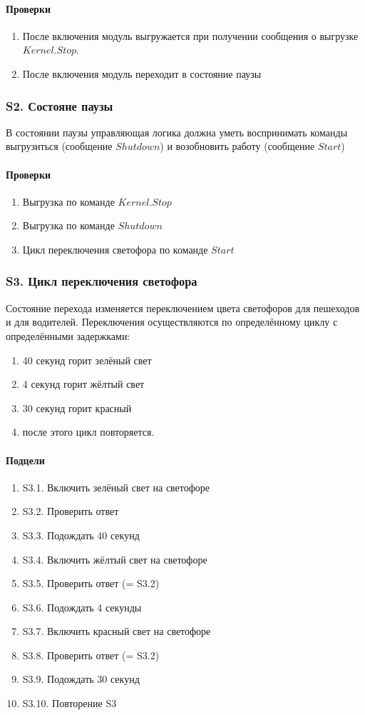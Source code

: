 			\paragraph{Проверки}
			\begin{enumerate}
				\item После включения модуль выгружается при получении сообщения о выгрузке $ Kernel.Stop $.
				\item После включения модуль переходит в состояние паузы
			\end{enumerate}
		\subsubsection{S2. Состояне паузы}
			В состоянии паузы управляющая логика должна уметь воспринимать команды выгрузиться (сообщение $ Shutdown $) и возобновить работу (сообщение $ Start $)
			\paragraph{Проверки}
				\begin{enumerate}
					\item Выгрузка по команде  $ Kernel.Stop $
					\item Выгрузка по команде $ Shutdown $
					\item Цикл переключения светофора по команде $ Start $
				\end{enumerate}
		\subsubsection{S3. Цикл переключения светофора}
		Состояние перехода изменяется переключением цвета светофоров для пешеходов и для водителей. Переключения осуществляются по определённому циклу с определёнными задержками:
			\begin{enumerate}
				\item 40 секунд горит зелёный свет
				\item 4 секунд горит жёлтый свет
				\item 30 секунд горит красный
				\item после этого цикл повторяется.
			\end{enumerate}
		\paragraph{Подцели}
			\begin{enumerate}
				\item S3.1. Включить зелёный свет на светофоре
				\item S3.2. Проверить ответ
				\item S3.3. Подождать 40 секунд
				\item S3.4. Включить жёлтый свет на светофоре
				\item S3.5. Проверить ответ (= S3.2)
				\item S3.6. Подождать 4 секунды
				\item S3.7. Включить красный свет на светофоре
				\item S3.8. Проверить ответ (= S3.2)
				\item S3.9. Подождать 30 секунд
				\item S3.10. Повторение S3
			\end{enumerate}
